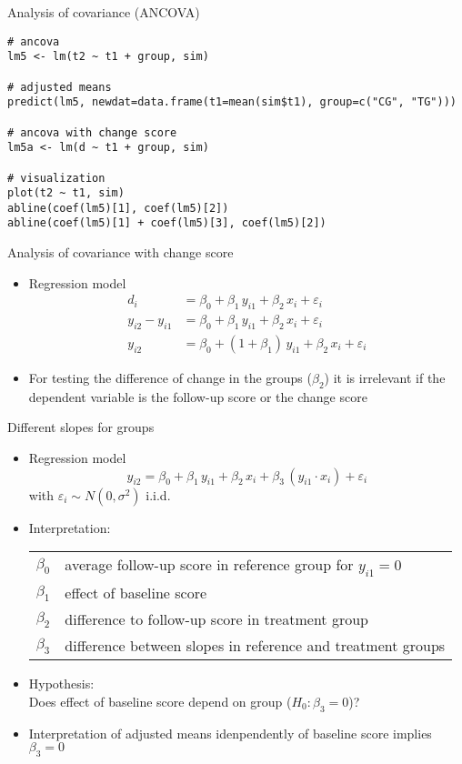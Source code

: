 \documentclass[aspectratio=169]{beamer}
\begin{document}
{

\begin{frame}[fragile]{Analysis of covariance (ANCOVA)}
\begin{lstlisting}
# ancova
lm5 <- lm(t2 ~ t1 + group, sim)

# adjusted means
predict(lm5, newdat=data.frame(t1=mean(sim$t1), group=c("CG", "TG")))

# ancova with change score
lm5a <- lm(d ~ t1 + group, sim)

# visualization
plot(t2 ~ t1, sim)
abline(coef(lm5)[1], coef(lm5)[2])
abline(coef(lm5)[1] + coef(lm5)[3], coef(lm5)[2])
\end{lstlisting}
\end{frame}

}

\begin{frame}{Analysis of covariance with change score}
\begin{itemize}
  \item Regression model
    \begin{align*}
                  d_i &= \beta_0 + \beta_1 \, y_{i1} + \beta_2 \, x_i + \varepsilon_i \\
      y_{i2} - y_{i1} &= \beta_0 + \beta_1 \, y_{i1} + \beta_2 \, x_i + \varepsilon_i \\
               y_{i2} &= \beta_0 + (1 + \beta_1) \, y_{i1} + \beta_2 \, x_i + \varepsilon_i
    \end{align*}
  \item For testing the difference of change in the groups ($\beta_2$) it
    is irrelevant if the dependent variable is the follow-up score or the
    change score
  \vfill
\end{itemize}
\end{frame}

\begin{frame}{Different slopes for groups}
\begin{itemize}
  \item Regression model
    \[
      y_{i2} = \beta_0 + \beta_1 \, y_{i1} + \beta_2 \, x_i +
               \beta_3 \, (y_{i1} \cdot x_i) + \varepsilon_i
    \]
    with $\varepsilon_i \sim N(0, \sigma^2)$ i.i.d.
  \item Interpretation:
    \begin{tabular}{lp{10cm}}
    $\beta_0$ & average follow-up score in reference group for $y_{i1} = 0$\\
    $\beta_1$ & effect of baseline score\\
    $\beta_2$ & difference to follow-up score in treatment group\\
    $\beta_3$ & difference between slopes in reference and treatment groups
    \end{tabular}
  \item Hypothesis:\\
        Does effect of baseline score depend on group ($H_0\colon \beta_3 = 0$)?
  \item Interpretation of adjusted means idenpendently of baseline score
    implies $\beta_3 = 0$
\end{itemize}
\end{frame}
\end{document}
